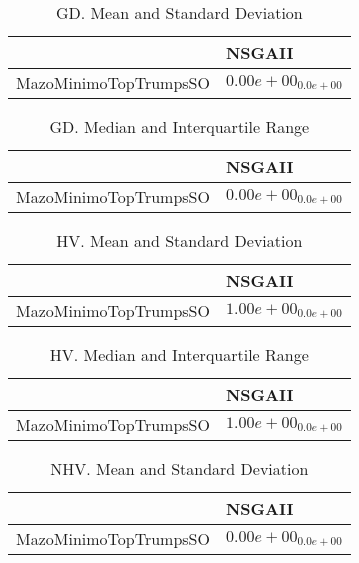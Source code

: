 \documentclass{article}
\begin{document}
\begin{table}
\caption{GD. Mean and Standard Deviation}
\label{table: GD}
\centering
\begin{scriptsize}
\begin{tabular}{ll}
\hline &  NSGAII\\
\hline 
MazoMinimoTopTrumpsSO & \cellcolor{gray95}$  0.00e+00_{ 0.0e+00}$ \\
\hline
\end{tabular}
\end{scriptsize}
\end{table}

\begin{table}
\caption{GD. Median and Interquartile Range}
\label{table: GD}
\centering
\begin{scriptsize}
\begin{tabular}{ll}
\hline &  NSGAII\\
\hline 
MazoMinimoTopTrumpsSO & \cellcolor{gray95}$  0.00e+00_{ 0.0e+00}$ \\
\hline
\end{tabular}
\end{scriptsize}
\end{table}

\begin{table}
\caption{HV. Mean and Standard Deviation}
\label{table: HV}
\centering
\begin{scriptsize}
\begin{tabular}{ll}
\hline &  NSGAII\\
\hline 
MazoMinimoTopTrumpsSO & \cellcolor{gray95}$  1.00e+00_{ 0.0e+00}$ \\
\hline
\end{tabular}
\end{scriptsize}
\end{table}

\begin{table}
\caption{HV. Median and Interquartile Range}
\label{table: HV}
\centering
\begin{scriptsize}
\begin{tabular}{ll}
\hline &  NSGAII\\
\hline 
MazoMinimoTopTrumpsSO & \cellcolor{gray95}$  1.00e+00_{ 0.0e+00}$ \\
\hline
\end{tabular}
\end{scriptsize}
\end{table}

\begin{table}
\caption{NHV. Mean and Standard Deviation}
\label{table: NHV}
\centering
\begin{scriptsize}
\begin{tabular}{ll}
\hline &  NSGAII\\
\hline 
MazoMinimoTopTrumpsSO & \cellcolor{gray95}$  0.00e+00_{ 0.0e+00}$ \\
\hline
\end{tabular}
\end{scriptsize}
\end{table}
\end{document}
